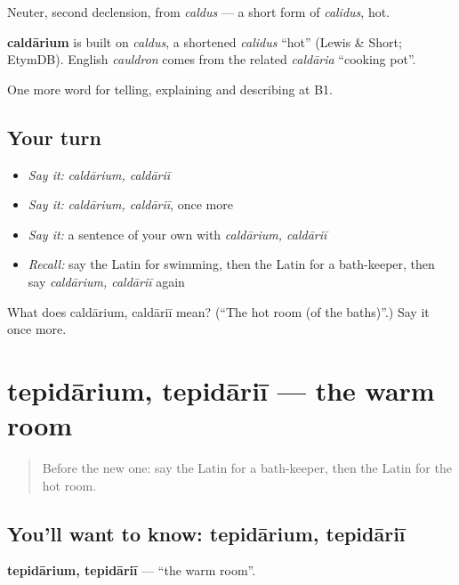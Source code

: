 Neuter, second declension, from \emph{caldus} — a short form of \emph{calidus}, hot.

\begin{cousinweb}
\textbf{caldārium} is built on \emph{caldus}, a shortened \emph{calidus} \textquotedblleft{}hot\textquotedblright{} (Lewis \& Short; EtymDB). English \emph{cauldron} comes from the related \emph{caldāria} \textquotedblleft{}cooking pot\textquotedblright{}.
\end{cousinweb}

\begin{grammarlens}[title={What you've built}]
One more word for telling, explaining and describing at B1.
\end{grammarlens}

\subsection*{Your turn}
\begin{itemize}
\raggedright
  \item \emph{Say it:} \emph{caldārium, caldāriī}
  \item \emph{Say it:} \emph{caldārium, caldāriī}, once more
  \item \emph{Say it:} a sentence of your own with \emph{caldārium, caldāriī}
  \item \emph{Recall:} say the Latin for swimming, then the Latin for a bath-keeper, then say \emph{caldārium, caldāriī} again
\end{itemize}

\begin{tcolorbox}[breakable,colback=teal!4,colframe=teal!35!black,title={Before you move on}]
What does caldārium, caldāriī mean? (\textquotedblleft{}The hot room (of the baths)\textquotedblright{}.) Say it once more.
\end{tcolorbox}
\section[tepidārium, tepidāriī]{tepidārium, tepidāriī — the warm room}

\label{lesson:LA-C541-tepidarium}



\begin{quote}
Before the new one: say the Latin for a bath-keeper, then the Latin for the hot room.
\end{quote}

\subsection*{You'll want to know: tepidārium, tepidāriī}
\textbf{tepidārium, tepidāriī} — \textquotedblleft{}the warm room\textquotedblright{}.

